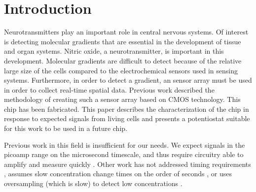 \chapter{Introduction}

Neurotransmitters play an important role in central nervous systems. Of interest is detecting molecular gradients that are essential in the development of tissue and organ systems. Nitric oxide, a neurotransmitter, is important in this development. Molecular gradients are difficult to detect because of the relative large size of the cells compared to the electrochemical sensors used in sensing systems. Furthermore, in order to detect a gradient, an sensor array must be used in order to collect real-time spatial data. Previous work described the methodology of creating such a sensor array based on CMOS technology. This chip has been fabricated. This paper describes the characterization of the chip in response to expected signals from living cells and presents a potentiostat suitable for this work to be used in a future chip.

Previous work in this field is insufficient for our needs. We expect signals in the picoamp range on the microsecond timescale, and thus require circuitry able to amplify and measure quickly \cite{mosharok2005aee}. Other work has not addressed timing requirements \cite{zhang2005eam} \cite{steffan2007scp}, assumes slow concentration change times on the order of seconds \cite{murari2005ipn}, or uses oversampling (which is slow) to detect low concentrations \cite{murari2005ipn} \cite{stanacevic2007vpa}.
